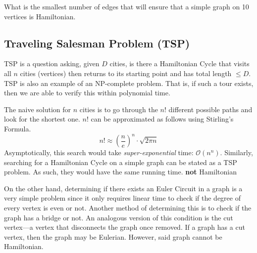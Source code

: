 \begin{nexample}
  What is the smallest number of edges that will ensure that a simple graph on
  10 vertices is Hamiltonian.
\end{nexample}

\subsection{Traveling Salesman Problem (TSP)}

TSP is a question asking, given \(D\) cities, is there a Hamiltonian Cycle 
that visits all \(n\) cities (vertices) then returns to its starting point
and has total length \(\leq D\). TSP is also an example of an NP-complete 
problem. That is, if such a tour exists, then we are able to verify this within
polynomial time.

The naive solution for \(n\) cities is to go through the \(n!\) different
possible paths and look for the shortest one. \(n!\) can be approximated as
follows using Stirling's Formula.
\[ n! \approx \left(\frac{n}{e}\right)^n \cdot \sqrt{2 \pi n} \]
Asymptotically, this search would take \textit{super-exponential} time:
\(\mathcal{O}(n^n)\). Similarly, searching for a Hamiltonian Cycle on a simple 
graph can be stated as a TSP problem. As such, they would have the same 
running time.
\textbf{not} Hamiltonian 

On the other hand, determining if there exists an Euler Circuit in a graph is a
very simple problem since it only requires linear time to check if the degree of
every vertex is even or not. Another method of determining this is to check if
the graph has a bridge or not. An analogous version of this condition is the cut
vertex---a vertex that disconnects the graph once removed. If a graph has a cut
vertex, then the graph may be Eulerian. However, said graph cannot be
Hamiltonian.
